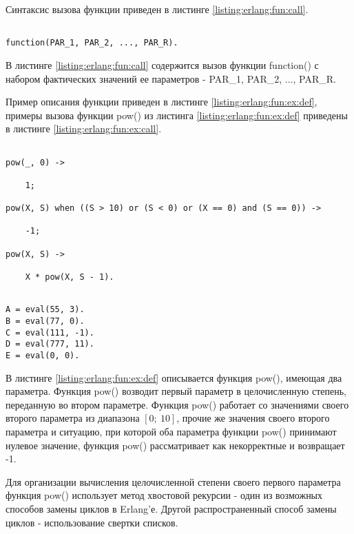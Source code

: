 Синтаксис вызова функции приведен в листинге \ref{listing:erlang:fun:call}.

\begin{lstlisting}

function(PAR_1, PAR_2, ..., PAR_R).

\end{lstlisting}
\mylistingend

В листинге \ref{listing:erlang:fun:call} содержится вызов функции function() с набором фактических значений ее параметров - PAR\_1, PAR\_2, ..., PAR\_R.

Пример описания функции приведен в листинге \ref{listing:erlang:fun:ex:def}, примеры вызова функции pow() из листинга \ref{listing:erlang:fun:ex:def} приведены в листинге \ref{listing:erlang:fun:ex:call}.

\begin{lstlisting}

pow(_, 0) ->

	1;

pow(X, S) when ((S > 10) or (S < 0) or (X == 0) and (S == 0)) ->

	-1;

pow(X, S) ->

	X * pow(X, S - 1).

\end{lstlisting}
\mylistingend

\begin{lstlisting}

A = eval(55, 3).
B = eval(77, 0).
C = eval(111, -1).
D = eval(777, 11).
E = eval(0, 0).

\end{lstlisting}
\mylistingend

В листинге \ref{listing:erlang:fun:ex:def} описывается функция pow(), имеющая два параметра. Функция pow() возводит первый параметр в целочисленную степень, переданную во втором параметре. Функция pow() работает со значениями своего второго параметра из диапазона $[0 ;~ 10]$, прочие же значения своего второго параметра и ситуацию, при которой оба параметра функции pow() принимают нулевое значение, функция pow() рассматривает как некорректные и возвращает -1.

Для организации вычисления целочисленной степени своего первого параметра функция pow() использует метод хвостовой рекурсии - один из возможных способов замены циклов в Erlang'е. Другой распространенный способ замены циклов - использование свертки списков.

